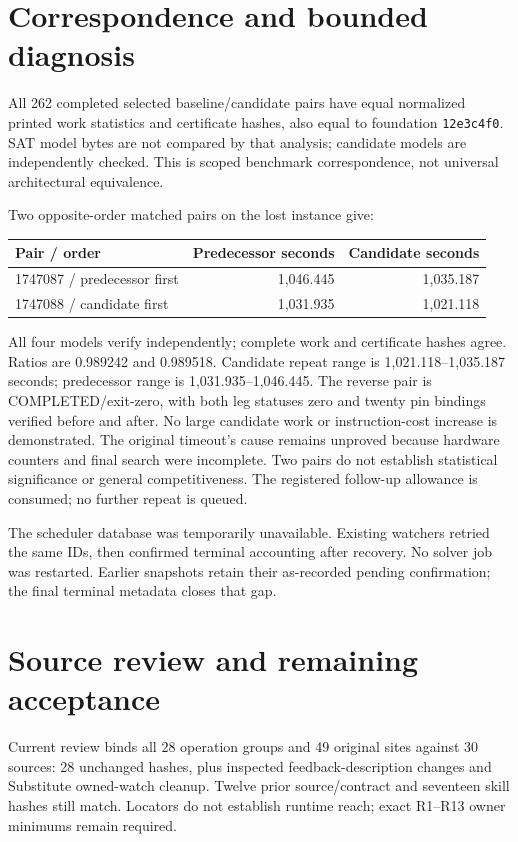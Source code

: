 \documentclass[11pt]{article}
\begin{document}
\section*{Correspondence and bounded diagnosis}
All 262 completed selected baseline/candidate pairs have equal normalized
printed work statistics and certificate hashes, also equal to foundation
\texttt{12e3c4f0}. SAT model bytes are not compared by that analysis; candidate
models are independently checked. This is scoped benchmark correspondence,
not universal architectural equivalence.

Two opposite-order matched pairs on the lost instance give:
\begin{center}
\begin{tabular}{lrr}
\toprule
Pair / order & Predecessor seconds & Candidate seconds \\
\midrule
1747087 / predecessor first & 1,046.445 & 1,035.187 \\
1747088 / candidate first & 1,031.935 & 1,021.118 \\
\bottomrule
\end{tabular}
\end{center}
All four models verify independently; complete work and certificate hashes
agree. Ratios are 0.989242 and 0.989518. Candidate repeat range is
1,021.118--1,035.187 seconds; predecessor range is 1,031.935--1,046.445.
The reverse pair is COMPLETED/exit-zero, with both leg statuses zero and
twenty pin bindings verified before and after. No large candidate work or
instruction-cost increase is demonstrated. The original timeout's cause
remains unproved because hardware counters and final search were incomplete.
Two pairs do not establish statistical significance or general competitiveness.
The registered follow-up allowance is consumed; no further repeat is queued.

The scheduler database was temporarily unavailable. Existing watchers retried
the same IDs, then confirmed terminal accounting after recovery. No solver job
was restarted. Earlier snapshots retain their as-recorded pending confirmation;
the final terminal metadata closes that gap.

\section*{Source review and remaining acceptance}
Current review binds all 28 operation groups and 49 original sites against
30 sources: 28 unchanged hashes, plus inspected feedback-description changes
and Substitute owned-watch cleanup. Twelve prior source/contract and seventeen
skill hashes still match. Locators do not establish runtime reach; exact
R1--R13 owner minimums remain required.
\end{document}

